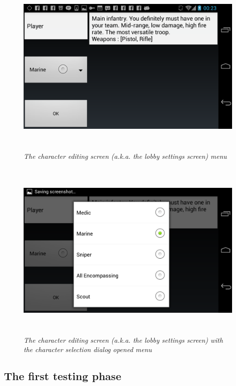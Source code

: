 \begin{figure}
\includegraphics[height=3.5in,width=6.23in]{./images/android_screenshots/first_development/game_first_development_9.png}
\caption{\small \sl The character editing screen (a.k.a. the lobby settings
screen) menu\label{fig:lobby_settings_1}}
\end{figure}

\begin{figure}
\includegraphics[height=3.5in,width=6.23in]{./images/android_screenshots/first_development/game_first_development_10.png}
\caption{\small \sl The character editing screen (a.k.a. the lobby settings
screen) with the character selection dialog opened
menu\label{fig:lobby_settings_2}}
\end{figure}


\subsection{The first testing phase}


